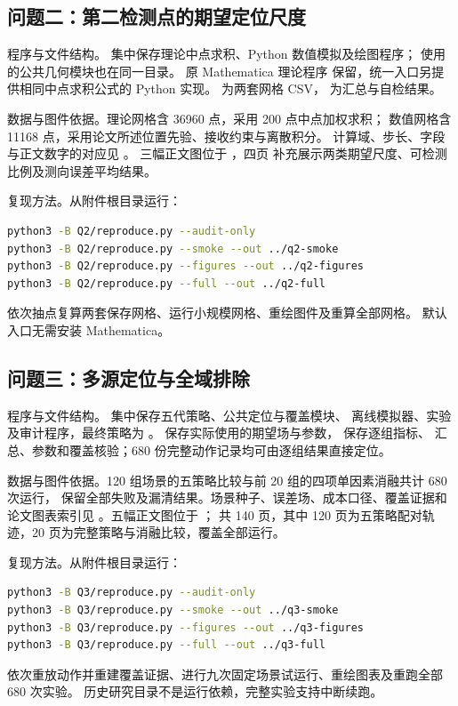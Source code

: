 \begin{appendices}
\subsection{问题二：第二检测点的期望定位尺度}
{\heiti 程序与文件结构。} 集中保存理论中点求积、Python 数值模拟及绘图程序；
 使用的公共几何模块也在同一目录。
原 Mathematica 理论程序  保留，统一入口另提供相同中点求积公式的 Python 实现。
 为两套网格 CSV， 为汇总与自检结果。

{\heiti 数据与图件依据。}理论网格含 36960 点，采用 200 点中点加权求积；
数值网格含 11168 点，采用论文所述位置先验、接收约束与离散积分。
计算域、步长、字段与正文数字的对应见 。
三幅正文图位于 ，四页  补充展示两类期望尺度、可检测比例及测向误差平均结果。

{\heiti 复现方法。}从附件根目录运行：
\begin{lstlisting}[language=bash,caption={问题二的核验与复现入口}]
python3 -B Q2/reproduce.py --audit-only
python3 -B Q2/reproduce.py --smoke --out ../q2-smoke
python3 -B Q2/reproduce.py --figures --out ../q2-figures
python3 -B Q2/reproduce.py --full --out ../q2-full
\end{lstlisting}
依次抽点复算两套保存网格、运行小规模网格、重绘图件及重算全部网格。
默认入口无需安装 Mathematica。

\subsection{问题三：多源定位与全域排除}
{\heiti 程序与文件结构。} 集中保存五代策略、公共定位与覆盖模块、
离线模拟器、实验及审计程序，最终策略为 。
 保存实际使用的期望场与参数， 保存逐组指标、
汇总、参数和覆盖核验；680 份完整动作记录均可由逐组结果直接定位。

{\heiti 数据与图件依据。}120 组场景的五策略比较与前 20 组的四项单因素消融共计 680 次运行，
保留全部失败及漏清结果。场景种子、误差场、成本口径、覆盖证据和论文图表索引见
。五幅正文图位于 ；
 共 140 页，其中 120 页为五策略配对轨迹，20 页为完整策略与消融比较，覆盖全部运行。

{\heiti 复现方法。}从附件根目录运行：
\begin{lstlisting}[language=bash,caption={问题三的核验与复现入口}]
python3 -B Q3/reproduce.py --audit-only
python3 -B Q3/reproduce.py --smoke --out ../q3-smoke
python3 -B Q3/reproduce.py --figures --out ../q3-figures
python3 -B Q3/reproduce.py --full --out ../q3-full
\end{lstlisting}
依次重放动作并重建覆盖证据、进行九次固定场景试运行、重绘图表及重跑全部 680 次实验。
历史研究目录不是运行依赖，完整实验支持中断续跑。


\end{appendices}
